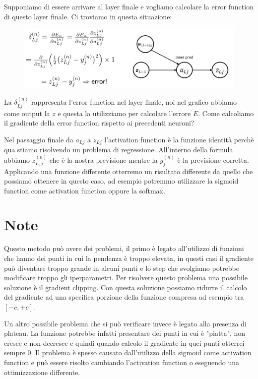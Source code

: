 \documentclass[14pt]{extreport}
\begin{document}
Supponiamo di essere arrivare al layer finale e vogliamo calcolare la error function di questo layer finale. Ci troviamo in questa situazione:
\begin{figure}[H]
\centering
\includegraphics[width=\linewidth]{401.jpeg}
\end{figure}

La $\delta_{Lj}^{(n)}$ rappresenta l'error function nel layer finale, noi nel grafico abbiamo come output la $z$ e questa la utilizziamo per calcolare
l'errore $E$. Come calcoliamo il gradiente della error function rispetto ai precedenti neuroni?

Nel passaggio finale da $a_{Lj}$ a $z_{Lj}$ l'activation function è la funzione identità perchè qua stiamo risolvendo un problema di regressione.
All'interno della formula abbiamo $z_{L,j}^{(n)}$ che è la nostra previsione mentre la $y_j^{(n)}$ è la previsione corretta. Applicando una funzione
differente otterremo un risultato differente da quello che possiamo ottenere in questo caso, ad esempio potremmo utilizzare la sigmoid function come
activation function oppure la softmax.


\section{Note}

Questo metodo può avere dei problemi, il primo è legato all'utilizzo di funzioni che hanno dei punti in cui la pendenza è troppo elevata, in questi
casi il gradiente può diventare troppo grande in alcuni punti e lo step che svolgiamo potrebbe modificare troppo gli iperparametri. Per risolvere
questo problema una possibile soluzione è il gradient clipping. Con questa soluzione possiamo ridurre il calcolo del gradiente ad una specifica
porzione della funzione compresa ad esempio tra $[-c,+c]$.

Un altro possibile problema che si può verificare invece è legato alla presenza di plateau. La funzione potrebbe infatti presentare dei punti in cui è
"piatta", non cresce e non decresce e quindi quando calcolo il gradiente in quei punti otterrei sempre 0. Il problema è spesso causato dall'utilizzo
della sigmoid come activation function e può essere risolto cambiando l'activation function o eseguendo una ottimizzazione differente.
\end{document}
